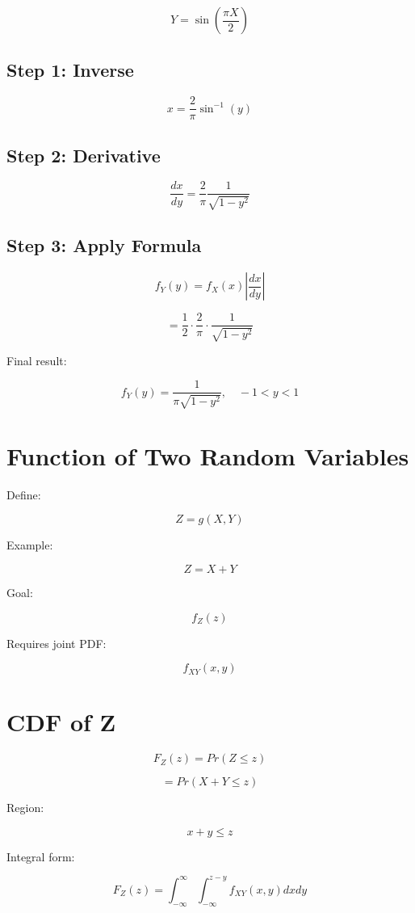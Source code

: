 \documentclass[12pt]{article}
\begin{document}
\[
Y =
\sin\left(\frac{\pi X}{2}\right)
\]

\subsection{Step 1: Inverse}

\[
x =
\frac{2}{\pi}
\sin^{-1}(y)
\]

\subsection{Step 2: Derivative}

\[
\frac{dx}{dy}
=
\frac{2}{\pi}
\frac{1}{\sqrt{1-y^2}}
\]

\subsection{Step 3: Apply Formula}

\[
f_Y(y)
=
f_X(x)
\left|\frac{dx}{dy}\right|
\]

\[
=
\frac{1}{2}
\cdot
\frac{2}{\pi}
\cdot
\frac{1}{\sqrt{1-y^2}}
\]

Final result:

\[
\boxed{
f_Y(y)
=
\frac{1}{\pi \sqrt{1-y^2}},
\quad -1<y<1
}
\]

\section{Function of Two Random Variables}

Define:

\[
Z = g(X,Y)
\]

Example:

\[
Z = X + Y
\]

Goal:

\[
f_Z(z)
\]

Requires joint PDF:

\[
f_{XY}(x,y)
\]

\section{CDF of Z}

\[
F_Z(z)
=
Pr(Z \le z)
\]

\[
=
Pr(X+Y \le z)
\]

Region:

\[
x+y \le z
\]

Integral form:

\[
F_Z(z)
=
\int_{-\infty}^{\infty}
\int_{-\infty}^{z-y}
f_{XY}(x,y)
dx dy
\]
\end{document}

